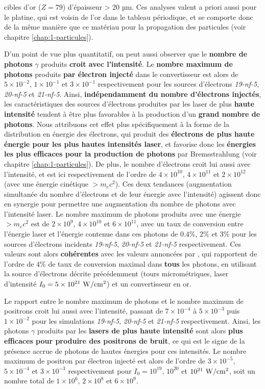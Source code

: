 \begin{refsection}
cibles d'or ($Z=79$) d'épaisseur > 20 µm. Ces analyses valent a priori aussi pour le platine, qui est voisin de l'or dans le tableau périodique, et se comporte donc de la même manière que ce matériau pour la propagation des particules (voir chapitre \ref{chap:1-particules}). 

D'un point de vue plus quantitatif, on peut aussi observer que le \textbf{nombre de photons} $\gamma$ produits \textbf{croit avec l'intensité}. Le \textbf{nombre maximum de photons} produits \textbf{par électron injecté} dans le convertisseur est alors de $5 \times 10^{-2}$, $1 \times 10^{-1}$ et $3 \times 10^{-1}$ respectivement pour les sources d'électrons \textit{19-nf-5}, \textit{20-nf-5} et \textit{21-nf-5}. Ainsi, \textbf{indépendamment du nombre d'électrons injectés}, les caractéristiques des sources d'électrons produites par les laser de plus \textbf{haute intensité} tendent à être plus favorables à la production d'un \textbf{grand nombre de photons}. Nous attribuons cet effet plus spécifiquement à la forme de la distribution en énergie des électrons, qui produit des \textbf{électrons de plus haute énergie pour les plus hautes intensités laser}, et favorise donc les \textbf{énergies les plus efficaces pour la production de photons} par Bremsstrahlung (voir chapitre \ref{chap:1-particules}). De plus, le nombre d'électrons croit lui aussi avec l'intensité, et est ici respectivement de l'ordre de $4 \times 10^{10}$, $4 \times 10^{11}$ et $2 \times 10^{12}$ (avec une énergie cinétique $>m_e c^2$). Ces deux tendances (augmentation simultanée du nombre d'électrons et de leur énergie avec l'intensité) agissent donc en synergie pour permettre une augmentation du nombre de photons avec l'intensité laser. Le nombre maximum de photons produits avec une énergie $> m_e c^2$ est de $2 \times 10^9$, $4 \times 10^{10}$ et $6 \times 10^{11}$, avec un taux de conversion entre l'énergie laser et l'énergie contenue dans ces photons de $0.4\%$, $2\%$ et $3\%$ pour les sources d'électrons incidents \textit{19-nf-5}, \textit{20-nf-5} et \textit{21-nf-5} respectivement. Ces valeurs sont alors \textbf{cohérentes} avec les valeurs annoncées par \cite{jiang_2014}, qui rapportent de l'ordre de $4 \%$ de taux de conversion maximal dans \textbf{tous} les photons, en utilisant la source d'électrons décrite précédemment (tours micrométriques, laser d'intensité $I_0 =5 \times 10^{21} ~ \rm W/cm^2$) et un convertisseur en or.

Le rapport entre le nombre maximum de photons et le nombre maximum de positrons croit lui aussi avec l'intensité, passant de $7\times10^{-4}$ à $5\times10^{-3}$ puis $1\times10^{-2}$ pour les simulations \textit{19-nf-5}, \textit{20-nf-5} et \textit{21-nf-5} respectivement. Ainsi, les photons $\gamma$ produits par les \textbf{lasers de plus haute intensité} sont alors \textbf{plus efficaces pour produire des positrons de bruit}, ce qui est le signe de la présence accrue de photons de hautes énergies pour ces intensités. Le nombre maximum de positron par électron injecté est alors de l'ordre de  $3 \times 10^{-5}$, $5 \times 10^{-4}$ et $3 \times 10^{-3}$ respectivement pour $I_0=10^{19}$, $10^{20}$ et $10^{21} ~ \rm W/cm^2$, soit un nombre total de $1 \times 10^6$, $2 \times 10^8$ et $6 \times 10^9$. 


\end{refsection}
